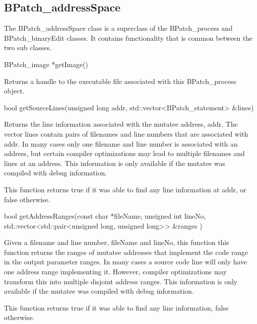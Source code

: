 \subsection{BPatch_addressSpace}

The BPatch_addressSpace class is a superclass of the BPatch_process and BPatch_binaryEdit classes. It contains
functionality that is common between the two sub classes.

\begin{apient}
BPatch_image *getImage()
\end{apient}

\begin{apidesc}
Returns a handle to the executable file associated with this BPatch_process object.
\end{apidesc}

\begin{apient}
bool getSourceLines(unsigned long addr, std::vector<BPatch_statement> &lines)
\end{apient}

\begin{apidesc}
Returns the line information associated with the mutatee address, addr. The vector lines contain pairs
of filenames and line numbers that are associated with addr. In many cases only one filename and line number is
associated with an address, but certain compiler optimizations may lead to multiple filenames and lines at an address.
This information is only available if the mutatee was compiled with debug information.

This function returns true if it was able to find any line information at addr, or false otherwise.
\end{apidesc}

\begin{apient}
bool getAddressRanges(const char *fileName, unsigned int lineNo, std::vector<std::pair<unsigned long, unsigned long>> &ranges )
\end{apient}

\begin{apidesc}
Given a filename and line number, fileName and lineNo, this function this function returns the ranges of mutatee
addresses that implement the code range in the output parameter ranges. In many cases a source code line will only
have one address range implementing it. However, compiler optimizations may transform this into multiple disjoint
address ranges. This information is only available if the mutatee was compiled with debug information.

This function returns true if it was able to find any line information, false otherwise.
\end{apidesc}

